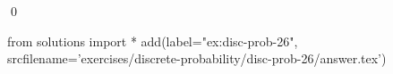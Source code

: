 
\begin{ex} 
  \label{ex:disc-prob-26}
  
  \qed
\end{ex} 
\begin{python0}
from solutions import *
add(label="ex:disc-prob-26",
    srcfilename='exercises/discrete-probability/disc-prob-26/answer.tex') 
\end{python0}
